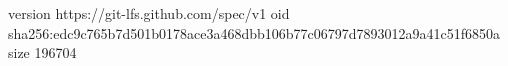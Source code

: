 version https://git-lfs.github.com/spec/v1
oid sha256:edc9c765b7d501b0178ace3a468dbb106b77c06797d7893012a9a41c51f6850a
size 196704
